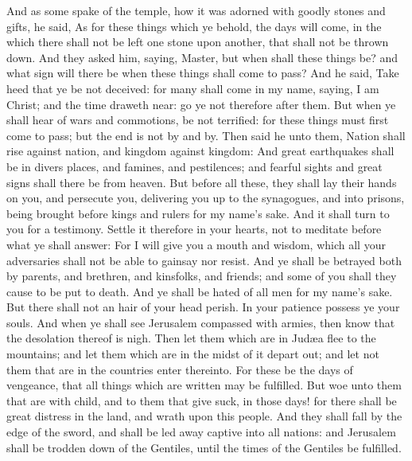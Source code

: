  And as some spake of the temple, how it was adorned with
goodly stones and gifts, he said,  As for these things which
ye behold, the days will come, in the which there shall not be left one
stone upon another, that shall not be thrown down.  And they
asked him, saying, Master, but when shall these things be? and what sign
will there be when these things shall come to pass?  And he
said, Take heed that ye be not deceived: for many shall come in my name,
saying, I am Christ; and the time draweth near: go ye not therefore
after them.  But when ye shall hear of wars and commotions,
be not terrified: for these things must first come to pass; but the end
is not by and by.  Then said he unto them, Nation shall
rise against nation, and kingdom against kingdom:  And
great earthquakes shall be in divers places, and famines, and
pestilences; and fearful sights and great signs shall there be from
heaven.  But before all these, they shall lay their hands
on you, and persecute you, delivering you up to the synagogues, and into
prisons, being brought before kings and rulers for my name's sake.
 And it shall turn to you for a testimony. 
Settle it therefore in your hearts, not to meditate before what ye shall
answer:  For I will give you a mouth and wisdom, which all
your adversaries shall not be able to gainsay nor resist. 
And ye shall be betrayed both by parents, and brethren, and kinsfolks,
and friends; and some of you shall they cause to be put to death.
 And ye shall be hated of all men for my name's sake.
 But there shall not an hair of your head perish.
 In your patience possess ye your souls.  And
when ye shall see Jerusalem compassed with armies, then know that the
desolation thereof is nigh.  Then let them which are in
Judæa flee to the mountains; and let them which are in the midst of it
depart out; and let not them that are in the countries enter thereinto.
 For these be the days of vengeance, that all things which
are written may be fulfilled.  But woe unto them that are
with child, and to them that give suck, in those days! for there shall
be great distress in the land, and wrath upon this people. 
And they shall fall by the edge of the sword, and shall be led away
captive into all nations: and Jerusalem shall be trodden down of the
Gentiles, until the times of the Gentiles be fulfilled.

